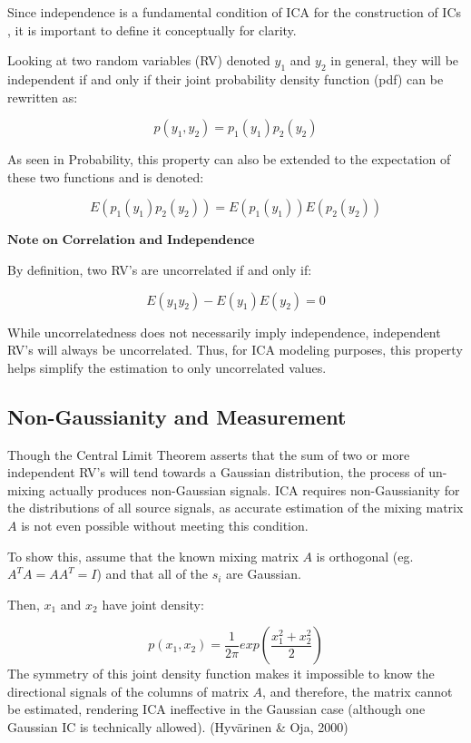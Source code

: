 \documentclass[12pt,twoside]{amherstthesis}
\begin{document}
  Since independence is a fundamental condition of ICA for the
  construction of ICs , it is important to define it conceptually for
  clarity.
  
  Looking at two random variables (RV) denoted \(y_1\) and \(y_2\) in
  general, they will be independent if and only if their joint probability
  density function (pdf) can be rewritten as:
  
  \[p(y_1,y_2) = p_1(y_1)p_2(y_2)\]
  
  As seen in Probability, this property can also be extended to the
  expectation of these two functions and is denoted: \newline
  
  \[E({p_1(y_1)p_2(y_2)}) = E(p_1({y_1}))E(p_2({y_2}))\]
  
  \(\textbf{Note on Correlation and Independence}\) \newline
  
  By definition, two RV's are uncorrelated if and only if:
  
  \[E({y_1y_2}) - E({y_1})E({y_2}) = 0\]
  
  While uncorrelatedness does not necessarily imply independence,
  independent RV's will always be uncorrelated. Thus, for ICA modeling
  purposes, this property helps simplify the estimation to only
  uncorrelated values.
  
  \subsection{Non-Gaussianity and
  Measurement}\label{non-gaussianity-and-measurement}
  
  Though the Central Limit Theorem asserts that the sum of two or more
  independent RV's will tend towards a Gaussian distribution, the process
  of un-mixing actually produces non-Gaussian signals. ICA requires
  non-Gaussianity for the distributions of all source signals, as accurate
  estimation of the mixing matrix \(A\) is not even possible without
  meeting this condition.
  
  To show this, assume that the known mixing matrix \(A\) is orthogonal
  (eg. \(A^{T}A = AA^{T}= I\)) and that all of the \(s_i\) are Gaussian.
  
  Then, \(x_1\) and \(x_2\) have joint density:
  
  \[ p(x_1,x_2) = \frac{1}{2\pi}exp{(\frac{x_1^2+x_2^2}{2})}\] The
  symmetry of this joint density function makes it impossible to know the
  directional signals of the columns of matrix \(A\), and therefore, the
  matrix cannot be estimated, rendering ICA ineffective in the Gaussian
  case (although one Gaussian IC is technically allowed). (Hyvärinen \&
  Oja, 2000)
  
\end{document}
